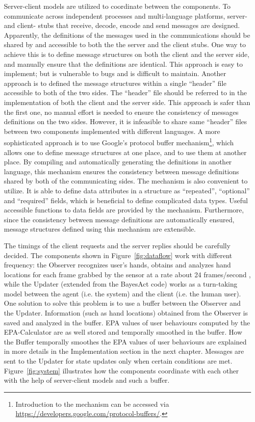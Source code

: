 Server-client models are utilized to coordinate between the components. To communicate across independent processes and multi-language platforms, server- and client- stubs that receive, decode, encode and send messages are designed. Apparently, the definitions of the messages used in the communications should be shared by and accessible to both the  the server and the client stubs. One way to achieve this is to define message structures on both the client and the server side, and manually ensure that the definitions are identical. This approach is easy to implement; but is vulnerable to bugs and is difficult to maintain. Another approach is to defined the message structures within a single ``header'' file accessible to both of the two sides. The ``header'' file should be referred to in the implementation of both the client and the server side. This approach is safer than the first one, no manual effort is needed to ensure the consistency of messages definitions on the two sides. However, it is infeasible to share same ``header'' files between two components implemented with different languages. A more sophisticated approach is to use Google's protocol buffer mechanism\footnote{Introduction to the mechanism can be accessed via \url{https://developers.google.com/protocol-buffers/}.}, which allows one to define message structures at one place, and to use them at another place. By compiling and automatically generating the definitions in another language, this mechanism ensures the consistency between message definitions shared by both of the communicating sides. The mechanism is also convenient to utilize. It is able to define data attributes in a structure as ``repeated'', ``optional'' and ``required'' fields, which is beneficial to define complicated data types. Useful accessible functions to data fields are provided by the mechanism. Furthermore, since the consistency between message definitions are automatically ensured, message structures defined using this mechanism are extensible.

The timings of the client requests and the server replies should be carefully decided. The components shown in Figure~\ref{fig:dataflow} work with different frequency: the Observer recognizes user's hands, obtains and analyzes hand locations for each frame grabbed by the sensor at a rate about 24 frames/second , while the Updater (extended from the BayesAct code) works as a turn-taking model between the agent (i.e. the system) and the client (i.e. the human user). One solution to solve this problem is to use a buffer between the Observer and the Updater. Information (such as hand locations) obtained from the Observer is saved and analyzed in the buffer. EPA values of user behaviours computed by the EPA-Calculator are as well stored and temporally smoothed in the buffer. How the Buffer temporally smoothes the EPA values of user behaviours are explained in more details in the Implementation section in the next chapter. Messages are sent to the Updater for state updates only when certain conditions are met. Figure~\ref{fig:system} illustrates how the components coordinate with each other with the help of server-client models and such a buffer.

